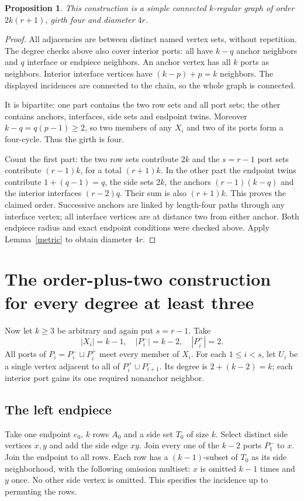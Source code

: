 \documentclass[11pt]{article}
\newtheorem{proposition}[theorem]{Proposition}
\begin{document}
\begin{proposition}\label{composite}
This construction is a simple connected $k$-regular graph of order
$2k(r+1)$, girth four and diameter $4r$.
\end{proposition}
\begin{proof}
All adjacencies are between distinct named vertex sets, without
repetition. The degree checks above also cover interior ports: all
have $k-q$ anchor neighbors and $q$ interface or endpiece neighbors.
An anchor vertex has all $k$ ports as neighbors. Interior interface
vertices have $(k-p)+p=k$ neighbors. The displayed incidences are
connected to the chain, so the whole graph is connected.

It is bipartite: one part contains the two row sets and all port
sets; the other contains anchors, interfaces, side sets and endpoint
twins. Moreover $k-q=q(p-1)\geq2$, so two members of any $X_i$
and two of its ports form a four-cycle. Thus the girth is four.

Count the first part: the two row sets contribute $2k$ and the
$s=r-1$ port sets contribute $(r-1)k$, for a total $(r+1)k$.
In the other part the endpoint twins contribute $1+(q-1)=q$,
the side sets $2k$, the anchors $(r-1)(k-q)$ and the interior
interfaces $(r-2)q$. Their sum is also $(r+1)k$.
This proves the claimed order. Successive anchors are linked by
length-four paths through any interface vertex; all interface
vertices are at distance two from either anchor. Both endpiece
radius and exact endpoint conditions were checked above. Apply
Lemma~\ref{metric} to obtain diameter $4r$.
\end{proof}

\section{The order-plus-two construction for every degree at least three}

Now let $k\geq3$ be arbitrary and again put $s=r-1$. Take
\[
 |X_i|=k-1,\quad |P_i^-|=k-2,\quad |P_i^+|=2.
\]
All ports of $P_i=P_i^-\sqcup P_i^+$ meet every member of $X_i$.
For each $1\leq i<s$, let $U_i$ be a single vertex adjacent to
all of $P_i^+\cup P_{i+1}^-$. Its degree is $2+(k-2)=k$;
each interior port gains its one required nonanchor neighbor.

\subsection*{The left endpiece}
Take one endpoint $e_0$, $k$ rows $A_0$ and a side set $T_0$ of
size $k$. Select distinct side vertices $x,y$ and add the side edge
$xy$. Join every one of the $k-2$ ports $P_1^-$ to $x$.
Join the endpoint to all rows. Each row has a $(k-1)$-subset of
$T_0$ as its side neighborhood, with the following omission multiset:
$x$ is omitted $k-1$ times and $y$ once. No other side vertex is
omitted. This specifies the incidence up to permuting the rows.
\end{document}
